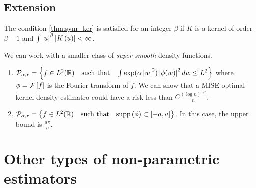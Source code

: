 \subsection{Extension}
\begin{remark}
  The condition \ref{thm:sym_ker} is satisfied for an integer $\beta$ if $K$ is a kernel of order $\beta-1$ and $\int \left| u\right|^\beta \left| K\left(u\right)\right|<\infty$.
\end{remark}
\begin{remark}
  We can work with a smaller class of \textit{super smooth} density functions.
  \begin{enumerate}
    \item $\mathcal{P}_{\alpha,r}=\left\{f\in L^2(\mathbb{R}) \quad \text{such that} \quad \int \exp(\alpha\left| w\right|^2)\left| \phi(w)\right|^2 dw \le L^2\right\}$ where $\phi=\mathcal{F}\left[f\right]$ is the Fourier transform of $f$. We can show that a MISE optimal kernel density estimatro could have a risk less than $C\frac{(\log n)^{1/r}}{n}$.
    \item $\mathcal{P}_{\alpha,r}=\left\{f\in L^2(\mathbb{R}) \quad \text{such that} \quad \text{supp}\left(\phi\right)\subset\left[-a,a\right]\right\}$. In this case, the upper bound is $\frac{a\pi}{n}$.
  \end{enumerate}
\end{remark}

\section{Other types of non-parametric estimators}
